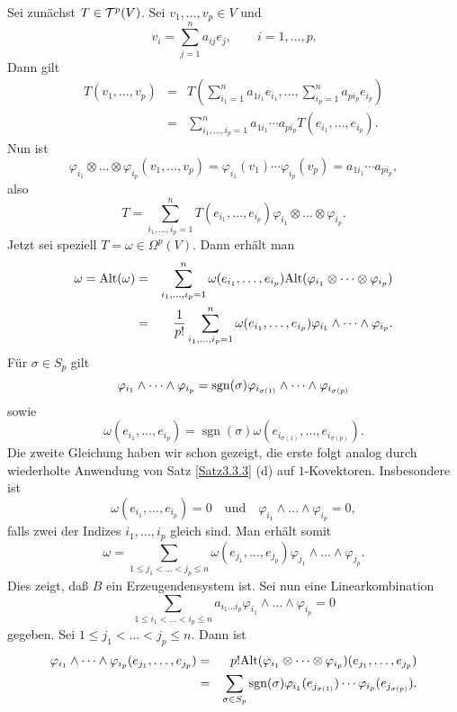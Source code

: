\documentclass[a4paper,twoside,DIV15,BCOR12mm]{scrbook}
\DeclareMathOperator{\sgn}{sgn}
\begin{document}
 Sei zunächst $T \in {\cal T}^{p}(V)$. Sei 
$v_{1},\dots,v_{p} \in V$ und
\[ v_{i} = \sum_{j=1}^{n} a_{ij} e_{j}, \qquad i = 1,\dots,p. \]
Dann gilt
\begin{eqnarray*}
T(v_{1},\dots,v_{p}) & = & T\left(\sum_{i_{1}=1}^{n} a_{1i_{1}} 
e_{i_1},\dots,\sum_{i_{p}=1}^{n} a_{pi_{p}} e_{i_p} \right) \\
& = & \sum_{i_{1},\dots,i_{p} = 1}^{n} a_{1i_{1}} \cdots a_{pi_{p}} 
T(e_{i_1},\dots,e_{i_p}).
\end{eqnarray*}
Nun ist
\[
\varphi_{i_1} \otimes \dots \otimes \varphi_{i_p} 
(v_{1},\dots,v_{p})  =  \varphi_{i_1}(v_{1}) \cdots 
\varphi_{i_p}(v_{p}) 
 =  a_{1i_{1}} \cdots a_{pi_{p}},
\]
also
\[ T = \sum_{i_{1},\dots,i_{p} = 1}^{n} T(e_{i_1},\dots,e_{i_p}) 
\varphi_{i_1} \otimes \dots \otimes \varphi_{i_p}. \]
Jetzt sei speziell $T = \omega \in \Omega^{p}(V)$. Dann erhält man
\begin{eqnarray*}
\omega = {\rm Alt}(\omega) & = & \sum_{i_{1},\dots,i_{p} = 1}^{n} 
\omega(e_{i_1},\dots,e_{i_p}) {\rm Alt}(\varphi_{i_1} \otimes \dots 
\otimes \varphi_{i_p}) \\
& = & \frac{1}{p!} \sum_{i_{1},\dots,i_{p} = 1}^{n} 
\omega(e_{i_1},\dots,e_{i_p}) \varphi_{i_1} \wedge \dots \wedge 
\varphi_{i_p}.
\end{eqnarray*}
Für $\sigma\in S_p$ gilt
\[ \varphi_{i_1} \wedge \dots \wedge \varphi_{i_p} = {\rm 
sgn}(\sigma) \varphi_{i_{\sigma(1)}} \wedge \dots \wedge 
\varphi_{i_{\sigma(p)}} \]
sowie
\[ \omega(e_{i_1},\dots,e_{i_p}) = \sgn (\sigma) 
\omega(e_{i_{\sigma(1)}},\dots,e_{i_{\sigma(p)}}). \]
Die zweite Gleichung haben wir schon gezeigt, die erste folgt analog durch 
wiederholte Anwendung von Satz \ref{Satz3.3.3} (d) auf $1$-Kovektoren. Insbesondere 
ist
\[\omega(e_{i_1},\dots,e_{i_p})=0\quad\text{und}\quad \varphi_{i_1} 
\wedge \dots \wedge \varphi_{i_p}=0,\]
falls zwei der Indizes $i_{1},\dots,i_{p}$ gleich sind. Man erhält somit
\[ \omega = \sum_{1 \le j_{1} < \dots < j_{p} \le n} 
\omega(e_{j_1},\dots,e_{j_p}) \varphi_{j_1} \wedge \dots \wedge 
\varphi_{j_p}. \]
Dies zeigt, daß $B$ ein Erzeugendensystem ist. Sei nun eine 
Linearkombination
\[ \sum_{1 \le i_{1} < \dots < i_{p} \le n} a_{i_{1} \dots i_{p}} 
\varphi_{i_1} \wedge \dots \wedge \varphi_{i_p} = 0 \]
gegeben. Sei $1 \le j_{1} < \dots < j_{p} \le n$. Dann ist
\begin{eqnarray*}
\varphi_{i_1} \wedge \dots \wedge 
\varphi_{i_p}(e_{j_1},\dots,e_{j_p}) 
& = & p! {\rm Alt}(\varphi_{i_1} \otimes \dots \otimes 
\varphi_{i_p}) (e_{j_1},\dots,e_{j_p}) \\
& = & \sum_{\sigma \in S_{p}} \sgn (\sigma) 
\varphi_{i_1}(e_{j_{\sigma(1)}}) \cdots \varphi_{i_p} 
(e_{j_{\sigma(p)}}).
\end{eqnarray*}
\end{document}
